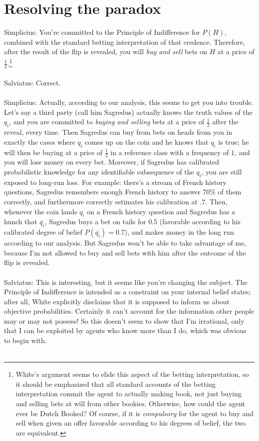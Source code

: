 \documentclass[letterpaper,12pt]{article}
\begin{document}
\section{Resolving the paradox}
Simplicius: You're committed to the Principle of Indifference for $P(H)$, combined with the standard betting interpretation of that credence. Therefore, after the result of the flip is revealed, you will \emph{buy and sell} bets on $H$ at a price of $\frac{1}{2}$.\footnote{White's argument seems to elide this aspect of the betting interpretation, so it should be emphasized that all standard accounts of the betting interpretation commit the agent to actually making book, not just buying and selling bets at will from other bookies. Otherwise, how could the agent ever be Dutch Booked? Of course, if it is \emph{compulsory} for the agent to buy and sell when given an offer favorable according to his degrees of belief, the two are equivalent.}\\ \\
Salviatus: Correct.\\ \\
Simplicius: Actually, according to our analysis, this seems to get you into trouble. Let's say a third party (call him Sagredus) actually knows the truth values of the $q_i$, and you are committed to \emph{buying and selling} bets at a price of $\frac{1}{2}$ after the reveal, every time. Then Sagredus can buy from bets on heads from you in exactly the cases where $q_i$ comes up on the coin and he knows that $q_i$ is true; he will then be buying at a price of $\frac{1}{2}$ in a reference class with a frequency of $1$, and you will lose money on every bet. Moreover, if Sagredus has calibrated probabilistic knowledge for any identifiable subsequence of the $q_i$, you are still exposed to long-run loss. For example: there's a stream of French history questions, Sagredus remembers enough French history to answer 70\% of them correctly, and furthermore correctly estimates his calibration at $.7$. Then, whenever the coin lands $q_i$ on a French history question and Sagredus has a hunch that $\overline{q_i}$, Sagredus buys a bet on tails for $0.5$ (favorable according to his calibrated degree of belief $P(\overline{q_i}) = 0.7$), and makes money in the long run according to our analysis. But Sagredus won't be able to take advantage of me, because I'm not allowed to buy and sell bets with him after the outcome of the flip is revealed.\\ \\
Salviatus: This is interesting, but it seems like you're changing the subject. The Principle of Indifference is intended as a constraint on your internal belief states; after all, White explicitly disclaims \citeyearpar[163]{White2009-WHIESA} that it is supposed to inform us about objective probabilities. Certainly it can't account for the information other people may or may not possess! So this doesn't seem to show that I'm irrational, only that I can be exploited by agents who know more than I do, which was obvious to begin with.\\ \\
\end{document}

